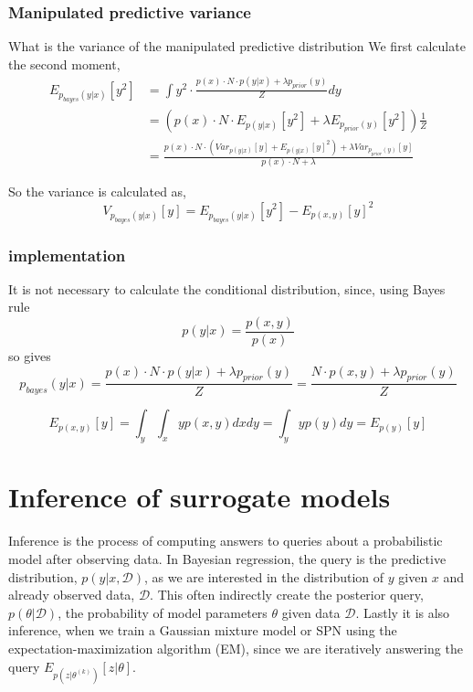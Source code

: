 \subsubsection{Manipulated predictive variance}
What is the variance of the manipulated predictive distribution
We first calculate the second moment, 
\begin{align*}
    E_{p_{bayes}(y|x)}[y^2] &= \int y^2 \cdot \frac{p(x)\cdot N \cdot p(y|x) + \lambda p_{prior}(y)}{Z} dy\\
    &= (p(x)\cdot N\cdot E_{p(y|x)}[y^2] + \lambda E_{p_{prior}(y)}[y^2] ) \frac{1}{Z}\\
    &= \frac{p(x)\cdot N \cdot(Var_{p(y|x)}[y]+E_{p(y|x)}[y]^2) + \lambda Var_{p_{prior}(y)}[y]}{p(x)\cdot N+\lambda}
\end{align*}

So the variance is calculated as, 
$$V_{p_{bayes}(y|x)}[y] = E_{p_{bayes}(y|x)}[y^2] - E_{p(x,y)}[y]^2$$

\subsubsection*{implementation}
It is not necessary to calculate the conditional distribution, since, using Bayes rule
$$p(y|x) = \frac{p(x,y)}{p(x)}$$
so gives
$$p_{bayes}(y|x) = \frac{p(x)\cdot N \cdot p(y|x) + \lambda p_{prior}(y)}{Z} = \frac{N \cdot p(x,y) + \lambda p_{prior}(y)}{Z}$$

$$E_{p(x,y)}[y] = \int_y \int_x yp(x,y) dx dy = \int_y y p(y) dy = E_{p(y)}[y]$$


\section{Inference of surrogate models}
Inference is the process of computing answers to queries about a probabilistic model after observing data. 
In Bayesian regression, the
query is the predictive distribution, $p(y|x,\mathcal{D})$, as we are interested in the distribution of $y$ given $x$ 
and already observed data, $\mathcal{D}$. 
This often indirectly create the posterior query, $p(\theta|\mathcal{D})$, the probability of model parameters $\theta$ given data
$\mathcal{D}$. Lastly it is also inference, when we train 
a Gaussian mixture model or SPN using the expectation-maximization algorithm (EM), since we are iteratively answering the query
$E_{p(z|\theta^{(k)})}[z|\theta]$.

